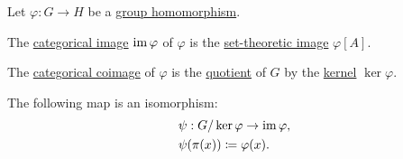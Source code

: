 \begin{proposition}\label{thm:group_image_and_coimage}
  Let \( \varphi: G \to H \) be a \hyperref[def:group/homomorphism]{group homomorphism}.

  \begin{thmenum}
     The \hyperref[def:zero_morphisms/image]{categorical image} \( \operatorname{im} \varphi \) of \( \varphi \) is the \hyperref[def:set_valued_map/image]{set-theoretic image} \( \varphi[A] \).

     The \hyperref[def:zero_morphisms/coimage]{categorical coimage} of \( \varphi \) is the \hyperref[def:group/quotient]{quotient} of \( G \) by the \hyperref[def:group/kernel]{kernel} \( \ker \varphi \).

     The following map is an isomorphism:
    \begin{equation*}
      \begin{aligned}
        &\psi: G / \ker \varphi \to \operatorname{im} \varphi, \\
        &\psi(\pi(x)) \coloneqq \varphi(x).
      \end{aligned}
    \end{equation*}
  \end{thmenum}
\end{proposition}
